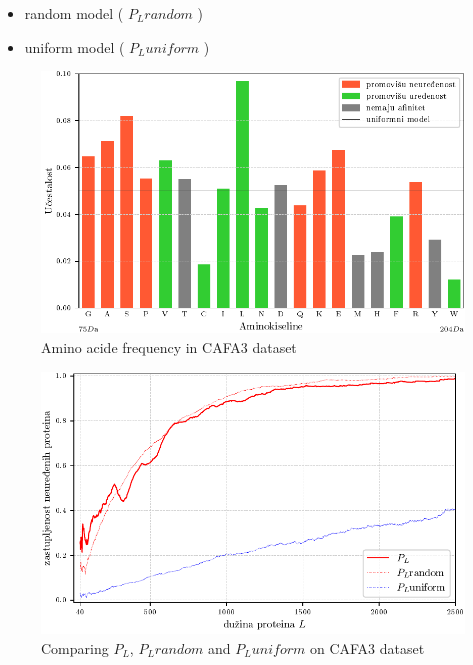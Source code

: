 \documentclass{beamer}
\begin{document}
\begin{frame}{}
  \begin{itemize}
    \item random model ( $P_L random$  )
    \item uniform model ( $P_L uniform$ )
  \end{itemize}

  \begin{figure}[th]
    \centering
    \includegraphics[scale=0.7]{plots/AK_ucestalost}
    \vspace{-0.2cm}
    \caption{ \footnotesize Amino acide frequency in CAFA3 dataset }
  \end{figure}
\end{frame}

\begin{frame}
  \begin{figure}[th]
    \centering
    \includegraphics[scale=0.8]{plots/PL_F_cmp}
    \caption{Comparing $P_L$, $P_L random$ and $P_L uniform$ on CAFA3 dataset}
  \end{figure}
\end{frame}
\end{document}
